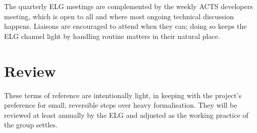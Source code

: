 \documentclass[11pt,a4paper]{article}
\begin{document}
The quarterly ELG meetings are complemented by the weekly ACTS developers meeting, which is open to all and where most ongoing technical discussion happens. Liaisons are encouraged to attend when they can; doing so keeps the ELG channel light by handling routine matters in their natural place.

\section*{Review}

These terms of reference are intentionally light, in keeping with the project's preference for small, reversible steps over heavy formalisation. They will be reviewed at least annually by the ELG and adjusted as the working practice of the group settles.
\end{document}

